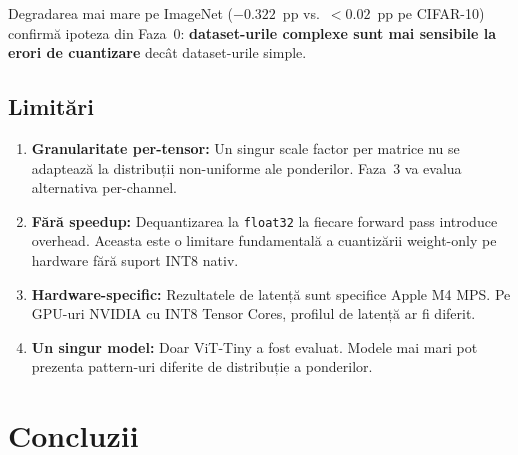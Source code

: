 \documentclass[12pt,a4paper]{article}
\begin{document}
Degradarea mai mare pe ImageNet ($-0.322$~pp vs.\ $<0.02$~pp pe CIFAR-10)
confirmă ipoteza din Faza~0: \textbf{dataset-urile complexe sunt mai
sensibile la erori de cuantizare} decât dataset-urile simple.

\subsection{Limitări}

\begin{enumerate}
  \item \textbf{Granularitate per-tensor:} Un singur scale factor per
    matrice nu se adaptează la distribuții non-uniforme ale ponderilor.
    Faza~3 va evalua alternativa per-channel.
  \item \textbf{Fără speedup:} Dequantizarea la \texttt{float32} la
    fiecare forward pass introduce overhead. Aceasta este o limitare
    fundamentală a cuantizării weight-only pe hardware fără suport INT8
    nativ.
  \item \textbf{Hardware-specific:} Rezultatele de latență sunt specifice
    Apple M4 MPS. Pe GPU-uri NVIDIA cu INT8 Tensor Cores, profilul de
    latență ar fi diferit.
  \item \textbf{Un singur model:} Doar ViT-Tiny a fost evaluat. Modele
    mai mari pot prezenta pattern-uri diferite de distribuție a ponderilor.
\end{enumerate}

\section{Concluzii}
\end{document}
